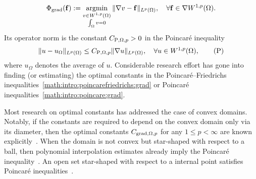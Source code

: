 \documentclass[10pt,letterpaper]{article}
\begin{document}
\begin{align*}
    \Phi_{\operatorname{grad}}( {\mathbf f} ) 
    := 
    \operatorname*{{\rm argmin}}\limits_{ \substack{ v \in W^{1,p}(\Omega) \\ \int_\Omega v = 0 } } \| \nabla v - {\mathbf f} \|_{L^{p}(\Omega)},
    \quad 
    \forall 
    {\mathbf f} \in \nabla W^{1,p}(\Omega)
    .
\end{align*} 
Its operator norm is the constant $C_{{\rm P},\Omega,p} > 0$ in the Poincar\'e inequality 
\begin{align}\label{math:intro:poincare:grad}
    \| u - u_{\Omega} \|_{L^{p}(\Omega)}
    \leq 
    C_{{\rm P},\Omega,p} \| \nabla u \|_{L^{p}(\Omega)},
    \quad 
    \forall 
    u \in W^{1,p}(\Omega)
    , \tag{P} %
\end{align}
where $u_\Omega$ denotes the average of $u$.
Considerable research effort has gone into finding (or estimating) the optimal constants in the Poincar\'e--Friedrichs inequalities~\eqref{math:intro:poincarefriedrichs:grad} or Poincar\'e inequalities~\eqref{math:intro:poincare:grad}. 

Most research on optimal constants has addressed the case of convex domains. 
Notably, if the constants are required to depend on the convex domain only via its diameter, 
then the optimal constants $C_{\operatorname{grad},\Omega,p}$ for any $1 \leq p < \infty$ are known explicitly~\cite{bebendorf2003note,acosta2004optimal,esposito2013poincare,ferone2012remark}.
When the domain is not convex but star-shaped with respect to a ball,
then polynomial interpolation estimates already imply the Poincar\'e inequality~\cite{brenner2008mathematical,ern2021finite}. 
An open set star-shaped with respect to a internal point satisfies Poincar\'e inequalities~\cite[Theorem~3.1]{hurri1988poincare}. 
\end{document}
